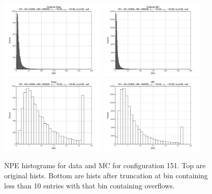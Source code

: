  \begin{figure}[htbp] \begin{center} 
\includegraphics[width=0.45\textwidth]{../FIGURES/151/FIG_Original_Data.pdf} 
\includegraphics[width=0.45\textwidth]{../FIGURES/151/FIG_Original_MC.pdf} 
\includegraphics[width=0.45\textwidth]{../FIGURES/151/FIG_Data.pdf} 
\includegraphics[width=0.45\textwidth]{../FIGURES/151/FIG_MC.pdf} 
\caption{NPE histograms for data and MC for configuration 151. Top are original hists. Bottom are hists after truncation at bin containing less than 10 entries with that bin containing overflows.} 
\label{tab:npe_151} 
\end{center} \end{figure} 
\clearpage
 